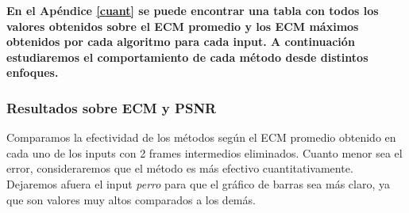\par  \textbf{En el Apéndice \ref{cuant} se puede encontrar una tabla con todos los valores obtenidos sobre el ECM promedio y los ECM máximos obtenidos por cada algoritmo para cada input. A continuación estudiaremos el comportamiento de cada método desde distintos enfoques.}

\subsubsection{Resultados sobre ECM y PSNR}


\par Comparamos la efectividad de los métodos según el ECM promedio obtenido en cada uno de los inputs con 2 frames intermedios eliminados. Cuanto menor sea el error, consideraremos que el método es más efectivo cuantitativamente. Dejaremos afuera el input \textit{perro} para que el gráfico de barras sea más claro, ya que son valores muy altos comparados a los demás.

\begin{figure}[ht]
	\begin{center}
	\end{center}
\end{figure}

